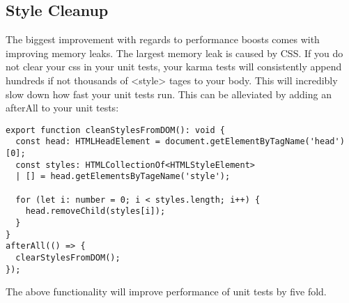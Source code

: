 \subsection{ Style Cleanup }
The biggest improvement with regards to performance boosts comes with improving
memory leaks. The largest memory leak is caused by CSS. If you do not clear
your css in your unit tests, your karma tests will consistently append hundreds
if not thousands of <style> tages to your body. This will incredibly slow down
how fast your unit tests run. This can be alleviated by adding an afterAll to
your unit tests:
\begin{lstlisting}
export function cleanStylesFromDOM(): void {
  const head: HTMLHeadElement = document.getElementByTagName('head')[0];
  const styles: HTMLCollectionOf<HTMLStyleElement>
  | [] = head.getElementsByTageName('style');

  for (let i: number = 0; i < styles.length; i++) {
    head.removeChild(styles[i]);
  }
}
afterAll(() => {
  clearStylesFromDOM();
});
\end{lstlisting}

The above functionality will improve performance of unit tests by five fold.
